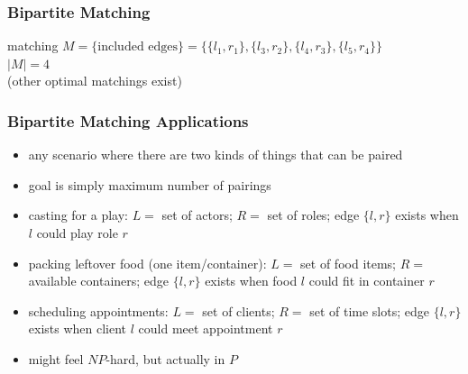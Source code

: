\documentclass[10pt,aspectratio=169]{beamer}
\begin{document}
\begin{frame} \frametitle{Bipartite Matching}
\begin{center}

  matching $M = \{\text{included edges}\}
    = \{ \{l_1, r_1\}, \{l_3, r_2\}, \{l_4, r_3\}, \{l_5, r_4\} \}$ \\

    $|M|=4$ \\

    (other optimal matchings exist)
\end{center}
\end{frame}

\begin{frame} \frametitle{Bipartite Matching Applications}
\begin{itemize}
  \item any scenario where there are two kinds of things that can be paired
  \item goal is simply maximum number of pairings
  \item casting for a play: $L = $ set of actors; $R = $ set of roles;
    edge $\{l, r\}$ exists when $l$ could play role $r$
  \item packing leftover food (one item/container): $L = $ set of food items; $R = $ available
    containers; edge $\{l, r\}$ exists when food $l$ could fit in container $r$
  \item scheduling appointments: $L = $ set of clients; $R = $ set of time slots;
    edge $\{l, r \}$ exists when client $l$ could meet appointment $r$
  \item might feel $NP$-hard, but actually in $P$
\end{itemize}
\end{frame}
\end{document}
